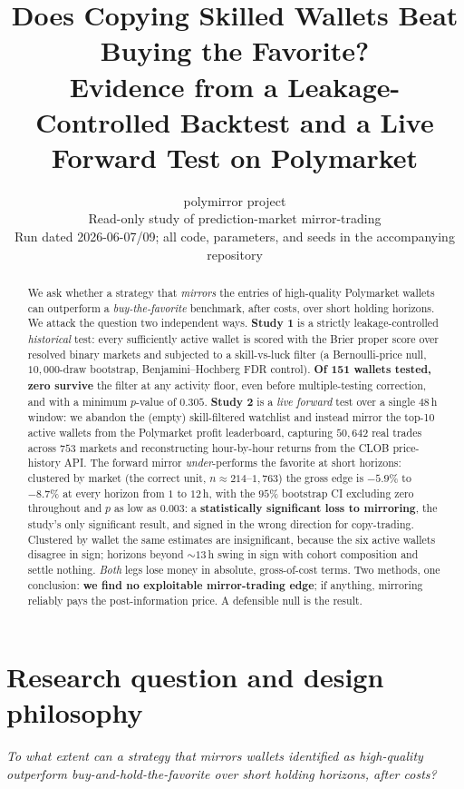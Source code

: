 \documentclass[11pt]{article}
\title{\textbf{Does Copying Skilled Wallets Beat Buying the Favorite?}\\[2pt]
\large Evidence from a Leakage-Controlled Backtest and a Live Forward Test
on Polymarket}
\author{polymirror project\\
\small Read-only study of prediction-market mirror-trading\\
\small Run dated 2026-06-07/09; all code, parameters, and seeds in the accompanying repository}
\date{}
\begin{document}
\maketitle

\begin{abstract}
\noindent
We ask whether a strategy that \emph{mirrors} the entries of high-quality Polymarket
wallets can outperform a \emph{buy-the-favorite} benchmark, after costs, over short
holding horizons. We attack the question two independent ways. \textbf{Study 1} is a
strictly leakage-controlled \emph{historical} test: every sufficiently active wallet is
scored with the Brier proper score over resolved binary markets and subjected to a
skill-vs-luck filter (a Bernoulli-price null, $10{,}000$-draw bootstrap, Benjamini--Hochberg
FDR control). \textbf{Of 151 wallets tested, zero survive} the filter at any activity
floor, even before multiple-testing correction, and with a minimum $p$-value of $0.305$.
\textbf{Study 2} is a \emph{live forward} test over a single $48$\,h window: we
abandon the (empty) skill-filtered watchlist and instead mirror the top-10 active wallets
from the Polymarket profit leaderboard, capturing $50{,}642$ real trades across $753$ markets
and reconstructing hour-by-hour returns from the CLOB price-history API. The forward mirror
\emph{under}-performs the favorite at short horizons: clustered by market (the correct unit,
$n\approx214$--$1{,}763$) the gross edge is $-5.9\%$ to $-8.7\%$ at every horizon from $1$ to
$12$\,h, with the $95\%$ bootstrap CI excluding zero throughout and $p$ as low as $0.003$: a
\textbf{statistically significant loss to mirroring}, the study's only significant result, and
signed in the wrong direction for copy-trading. Clustered by wallet the same estimates are
insignificant, because the six active wallets disagree in sign; horizons beyond ${\sim}13$\,h
swing in sign with cohort composition and settle nothing. \emph{Both} legs lose money in
absolute, gross-of-cost terms. Two methods, one conclusion: \textbf{we find no exploitable
mirror-trading edge}; if anything, mirroring reliably pays the post-information price. A
defensible null is the result.
\end{abstract}

\section{Research question and design philosophy}
\noindent
\textit{To what extent can a strategy that mirrors wallets identified as high-quality
outperform buy-and-hold-the-favorite over short holding horizons, after costs?}
\end{document}
